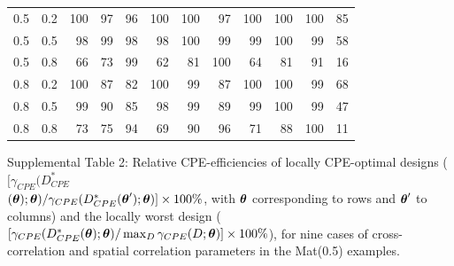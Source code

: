 \documentclass[12pt]{article}
\def\btheta{\mbox{\boldmath$\theta$}}
\begin{document}
{\begin{center}
\begin{tabular}{|cc|rrrrrrrrrr|}
0.5 & 0.2 & 100 & 97  & 96  & 100 & 100 & 97  & 100 & 100 & 100 & 85 \\
0.5 & 0.5 & 98  & 99  & 98  & 98  & 100 & 99  & 99  & 100 & 99  & 58 \\
0.5 & 0.8 & 66  & 73  & 99  & 62  & 81  & 100 & 64  & 81  & 91  & 16 \\
0.8 & 0.2 & 100 & 87  & 82  & 100 & 99  & 87  & 100 & 100 & 99  & 68 \\
0.8 & 0.5 & 99  & 90  & 85  & 98  & 99  & 89  & 99  & 100 & 99  & 47 \\
0.8 & 0.8 & 73  & 75  & 94  & 69  & 90  & 96  & 71  & 88  & 100 & 11 \\
\hline
\end{tabular}
\end{center}}
\newpage
\noindent
Supplemental Table 2:  Relative CPE-efficiencies of locally CPE-optimal designs ($[\gamma_{CPE}(D^{*}_{CPE}$\\$(\btheta);\btheta)/\gamma_{CPE}(D^{*}_{CPE}(\btheta^{\prime});\btheta)]\times 100\%$, with $\btheta$ corresponding to rows and $\btheta^{\prime}$ to columns) and the locally worst design ($[\gamma_{CPE}(D^{*}_{CPE}(\btheta);\btheta)/\max_{D}\gamma_{CPE}(D;\btheta)]\times 100\%$), for nine cases of cross-correlation and spatial correlation parameters in the Mat(0.5) examples.
\end{document}
